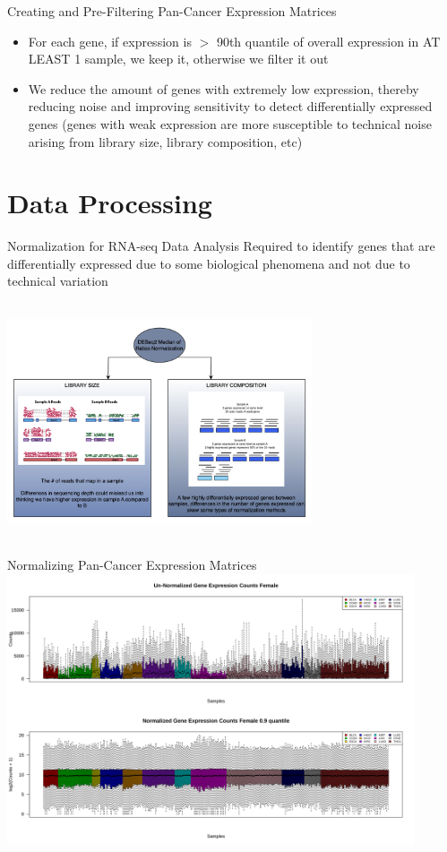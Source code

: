 \documentclass{beamer}
\begin{document}
	\begin{frame}{Creating and Pre-Filtering Pan-Cancer Expression Matrices}
		\begin{itemize}
			\item For each gene, if expression is $>$ 90th quantile of overall expression in AT LEAST 1 sample, we keep it, otherwise we filter it out
			\item We reduce the amount of genes with extremely low expression, thereby reducing noise and improving sensitivity to detect differentially expressed genes (genes with weak expression are more susceptible to technical noise arising from library size, library composition, etc)
		\end{itemize}
	\end{frame}

	\section{Data Processing}
	\begin{frame}{Normalization for RNA-seq Data Analysis}
		\centering Required to identify genes that are differentially expressed due to some biological phenomena and not due to technical variation
		
		\includegraphics[width=9cm,height=7cm]{img4.png}
	\end{frame}

	\begin{frame}{Normalizing Pan-Cancer Expression Matrices}
		\includegraphics[width=12cm, height=8cm]{all_cancers-F_before_and_after_normalization_v.png}
	\end{frame}
\end{document}
